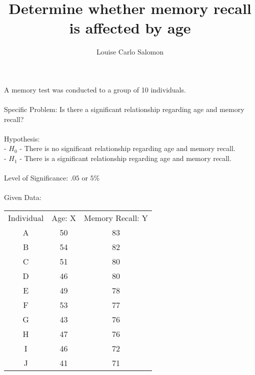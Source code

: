 \documentclass{article}
\title{Determine whether memory recall is affected by age}
\author{Louise Carlo Salomon}
\date{}
\begin{document}
     \maketitle
     A memory test was conducted to a group of 10 individuals.
     \\\\ Specific Problem: Is there a significant relationship regarding age and memory recall?
     \\\\  Hypothesis: \\ - \hspace{1cm} $H_0$ - There is no significant relationship regarding age and memory recall. 
     \\ -\hspace{1.2cm} $H_1$ - There is a significant relationship regarding age and memory recall.
     \\\\ Level of Significance: $.05$ or $5\%$
     \\\\ Given Data: 
     \begin{center}
         \begin{tabular}{ccc}
             Individual & Age: X & Memory Recall: Y \\
             A & 50 & 83 \\
             B & 54 & 82 \\
             C & 51 & 80 \\
             D & 46 & 80 \\
             E & 49 & 78 \\
             F & 53 & 77 \\
             G & 43 & 76 \\
             H & 47 & 76 \\
             I & 46 & 72 \\
             J & 41 & 71 \\
         \end{tabular}
     \end{center}
     \newpage
\end{document}
